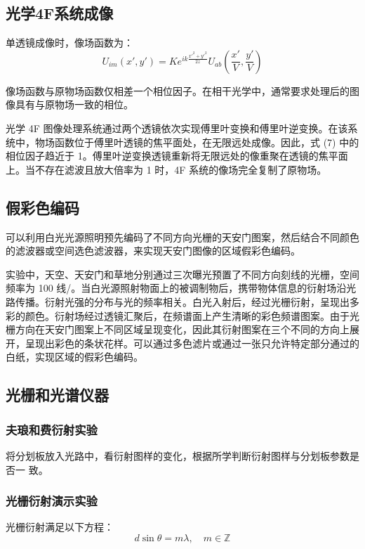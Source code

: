 \documentclass[UTF-8,twoside,cs4size]{ctexart}
\begin{document}
\subsection{光学4F系统成像}
单透镜成像时，像场函数为：
\begin{equation}
    U_{im} (x', y') = K e^{i k \frac{{x'}^2 + {y'}^2}{2z}} U_{ab}\left(\frac{x'}{V}, \frac{y'}{V}\right)
\end{equation}

像场函数与原物场函数仅相差一个相位因子。在相干光学中，通常要求处理后的图像具有与原物场一致的相位。

光学 4F 图像处理系统通过两个透镜依次实现傅里叶变换和傅里叶逆变换。在该系统中，物场函数位于傅里叶透镜的焦平面处，在无限远处成像。因此，式 (7) 中的相位因子趋近于 1。傅里叶逆变换透镜重新将无限远处的像重聚在透镜的焦平面上。当不存在滤波且放大倍率为 1 时，4F 系统的像场完全复制了原物场。

\subsection{假彩色编码}
可以利用白光光源照明预先编码了不同方向光栅的天安门图案，然后结合不同颜色的滤波器或空间选色滤波器，来实现天安门图像的区域假彩色编码。

实验中，天空、天安门和草地分别通过三次曝光预置了不同方向刻线的光栅，空间频率为 100 线/。当白光源照射物面上的被调制物后，携带物体信息的衍射场沿光路传播。衍射光强的分布与光的频率相关。白光入射后，经过光栅衍射，呈现出多彩的颜色。衍射场经过透镜汇聚后，在频谱面上产生清晰的彩色频谱图案。由于光栅方向在天安门图案上不同区域呈现变化，因此其衍射图案在三个不同的方向上展开，呈现出彩色的条状花样。可以通过多色滤片或通过一张只允许特定部分通过的白纸，实现区域的假彩色编码。

\subsection{光栅和光谱仪器}
\subsubsection{夫琅和费衍射实验}
将分划板放入光路中，看衍射图样的变化，根据所学判断衍射图样与分划板参数是否一
致。 
\subsubsection{光栅衍射演示实验}
光栅衍射满足以下方程：
\begin{equation}
    d \sin \theta = m \lambda, \quad m \in \mathbb{Z}
\end{equation}
\end{document}
